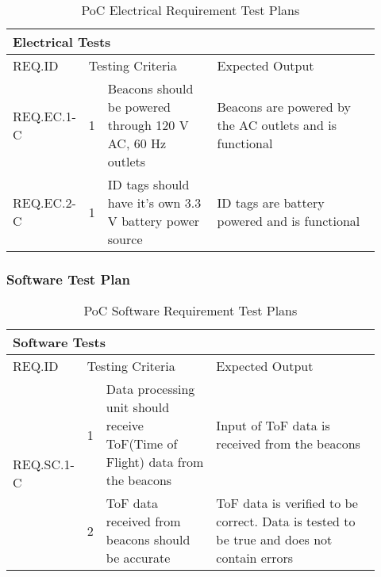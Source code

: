 \begin{table}[h!]
    \centering
    
    \begin{tabular}{|m{0.15\linewidth}|m{0.02\linewidth}|m{0.3\linewidth}|m{0.45\linewidth}|} 
    \hline
    \multicolumn{4}{|l|}{Electrical Tests}      \\ 
    \hline
    REQ.ID   & \multicolumn{2}{l|}{Testing Criteria}     & Expected Output     \\ 
    \hline
    REQ.EC.1-C                  
    & 1 
    & Beacons should be powered through 120 V AC, 60 Hz outlets
    & Beacons are powered by the AC outlets and is functional   \\ 
    \hline
    REQ.EC.2-C                  
    & 1 
    & ID tags should have it's own 3.3 V battery power source
    & ID tags are battery powered and is functional  \\ 
    \hline
\end{tabular}
	\caption{PoC Electrical Requirement Test Plans}
\end{table}

\subsubsection{Software Test Plan}

\begin{table}[h!]
    \centering
    \begin{tabular}{|m{0.15\linewidth}|m{0.02\linewidth}|m{0.3\linewidth}|m{0.45\linewidth}|} 
    \hline
    \multicolumn{4}{|l|}{Software Tests }           \\ 
    \hline
    REQ.ID      & \multicolumn{2}{l|}{Testing Criteria}      & Expected Output          \\ 
    \hline
    \multirow{2}{*}{REQ.SC.1-C} & 1 
    & Data processing unit should receive ToF(Time of Flight) data from the beacons
    & Input of ToF data is received from the beacons        \\ 
    \cline{2-4}
    & 2 
    & ToF data received from beacons should be accurate  
    & ToF data is verified to be correct. Data is tested to be true and does not contain errors   \\
    \hline 
\end{tabular}
	\caption{PoC Software Requirement Test Plans}
\end{table}

